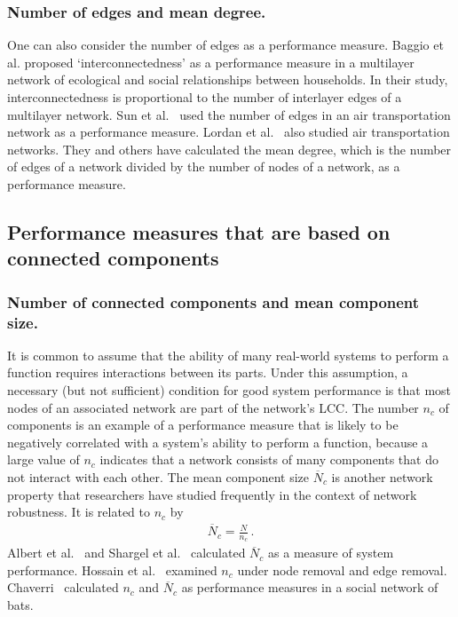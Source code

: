 \documentclass{comnet-mod}
\begin{document}
\subsubsection{Number of edges and mean degree.}

One can also consider the number of edges as a performance measure.
Baggio et al.\:\cite{Baggio2016} proposed `interconnectedness' as a performance measure in a multilayer network of ecological and social relationships between households. In their study, interconnectedness is proportional to the number of interlayer edges of a multilayer network.
Sun et al.~\cite{Sun2017} used the number of edges in an air transportation network as a performance measure. Lordan et al.~\cite{Lordan2014} also studied air transportation networks. They and others \cite{Sarma2012, Colladon2017} have calculated the mean degree, which is the number of edges of a network divided by the number of nodes of a network, as a performance measure.


\subsection{Performance measures that are based on connected components}\label{sec:review:components}


\subsubsection{Number of connected components and mean component size.} 

It is common to assume that the ability of many real-world systems to perform a function requires interactions between its parts. Under this assumption, a necessary (but not sufficient) condition for good system performance is that most nodes of an associated network are part of the network's LCC. The number $n_c$ of components is an example of a performance measure that is likely to be negatively correlated with a system's ability to perform a function, because a large value of $n_c$ indicates that a network consists of many components that do not interact with each other. The mean component size $\overline{N}_c$ is another network property that researchers have studied frequently in the context of network robustness. It is related to $n_c$ by
\begin{align}
	\overline{N}_c = \frac{N}{n_c}\,.\nonumber
\end{align}
Albert et al.~\cite{Albert2000} and Shargel et al.~\cite{Shargel2003} calculated $\overline{N}_c$ as a measure of system performance. Hossain et al.~\cite{Hossain2013} examined $n_c$ under node removal and edge removal. Chaverri~\cite{Chaverri2010} calculated $n_c$ and $\overline{N}_c$ as performance measures in a social network of bats.
\end{document}
